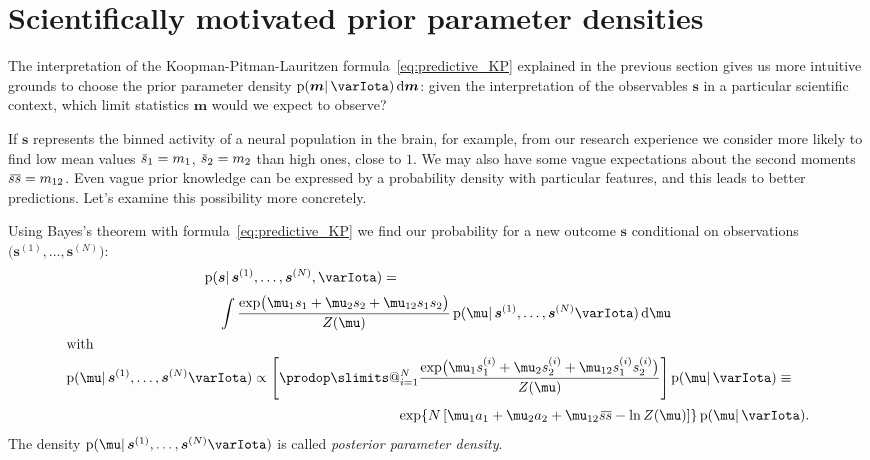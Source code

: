 \documentclass[\ifafour a4paper,12pt,\else a5paper,10pt,\fi%
onecolumn,oneside,article,%
british%
]{memoir}
\makeatletter
\theoremstyle{remark}
\theoremstyle{innote}
\def\prod{\DOTSI\prodop\slimits@}
\newcommand*{\di}{\mathrm{d}}%
\newcommand*{\pf}{\mathrm{p}}%
\renewcommand*{\|}{\mathpunct{|}}
\newcommand*{\widebar}[1]{{\mkern1.5mu\skew{2}\overline{\mkern-1.5mu#1\mkern-1.5mu}\mkern 1.5mu}}
\newcommand*{\yI}{\varIota}
\newcommand*{\ys}{\bm{s}}
\newcommand*{\yso}[1]{\ys^{(#1)}}
\newcommand*{\ysso}[1]{s^{(#1)}}
\newcommand*{\la}{\mu_{12}}
\newcommand*{\yth}{\bm{\mu}}
\newcommand*{\yt}{\bm{m}}
\newcommand*{\yl}{m_{12}}
\newcommand*{\yavv}{\widebar{s}}
\newcommand*{\ycv}{\widebar{ss}}
\makeatother
\begin{document}
\section{Scientifically motivated prior parameter densities}
\label{sec:other_priors}

The interpretation of the Koopman-Pitman-Lauritzen
formula~\eqref{eq:predictive_KP} explained in the previous section gives us
more intuitive grounds to choose the prior parameter density
$\pf(\yt \|\yI)\,\di\yt$: given the interpretation of the observables $\ys$
in a particular scientific context, which limit statistics $\yt$ would we
expect to observe?

If $\ys$ represents the binned activity of a neural population in the
brain, for example, from our research experience we consider more likely to
find low mean values $\yavv_1=m_1$, $\yavv_2=m_2$ than high ones, close to
$1$. We may also have some vague expectations about the second moments
$\ycv=\yl$. Even vague prior knowledge can be expressed by a probability
density with particular features, and this leads to better predictions.
Let's examine this possibility more concretely.

\bigskip


Using Bayes's theorem with formula~\eqref{eq:predictive_KP} we find our
probability for a new outcome $\ys$ conditional on observations
$\bigl( \yso{1}, \dotsc,\yso{N} \bigr)$:
\begin{subequations}    \label{eq:conditional_prediction}
  \begin{gather}
    \begin{multlined}[][0.9\linewidth]
      \pf(\ys \| \yso{1}, \dotsc, \yso{N}, \yI ) ={}\\[\jot]
      \int
      \frac{  \exp\bigl(
        \mu_1 s_1 + \mu_2 s_2 + \la s_1 s_2
        \bigr) }{Z(\yth)}
      \,
      \pf(\yth \| \yso{1},\dotsc,\yso{N} \yI) \, \di\yth
    \end{multlined}
    \\
    \shortintertext{with}
    \begin{multlined}[0.95\linewidth]
    \pf(\yth \| \yso{1},\dotsc,\yso{N} \yI)
    \propto
    \Biggl[  \prod_{i=1}^{N}
    \frac{  \exp\bigl(
      \mu_1 \ysso{i}_1 + \mu_2 \ysso{i}_2 + \la \ysso{i}_1 \ysso{i}_2
      \bigr) }{Z(\yth)}
    \Biggr]\,
    \pf(\yth \| \yI) 
\equiv{}\\[\jot]
     \exp\{N\,[
      \mu_1 a_1 + \mu_2 a_2 + \la \ycv -\ln Z(\yth)]\}\,
    \pf(\yth \| \yI).
  \end{multlined}
      \label{eq:posterior_density}
  \end{gather}
\end{subequations}
The density $\pf(\yth \| \yso{1},\dotsc,\yso{N} \yI)$ is called
\emph{posterior parameter density}.
\end{document}
